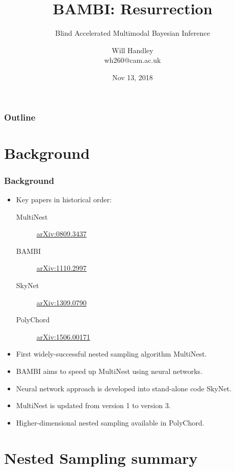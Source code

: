\documentclass[%
    handout
]{beamer}
\title{BAMBI\@: Resurrection}
\subtitle{Blind Accelerated Multimodal Bayesian Inference}
\author[Handley] %
{Will Handley\\ \small{wh260@cam.ac.uk}}
\institute[University of Cambridge] %
{%
Astrophysics Group \\
Cavendish Laboratory \\
University of Cambridge
}
\date{Nov 13, 2018}
\begin{document}
\begin{frame}
    \titlepage{}
\end{frame}

\begin{frame}
    \frametitle{Outline}
    \tableofcontents
\end{frame}

\section{Background}

\begin{frame}
    \frametitle{Background}
    \begin{itemize}
        \item Key papers in historical order:
            \begin{description}
                \item[MultiNest] \href{https://arxiv.org/abs/0809.3437}{arXiv:0809.3437} 
                \item[BAMBI]     \href{https://arxiv.org/abs/1110.2997}{arXiv:1110.2997} 
                \item[SkyNet]    \href{https://arxiv.org/abs/1309.0790}{arXiv:1309.0790}
                \item[PolyChord] \href{https://arxiv.org/abs/1506.00171}{arXiv:1506.00171} 
            \end{description}
        \item First widely-successful nested sampling algorithm MultiNest.
        \item BAMBI aims to speed up MultiNest using neural networks.
        \item Neural network approach is developed into stand-alone code SkyNet.
        \item MultiNest is updated from version 1 to version 3.
        \item Higher-dimensional nested sampling available in PolyChord.
    \end{itemize}
\end{frame}


\section{Nested Sampling summary}
\end{document}
